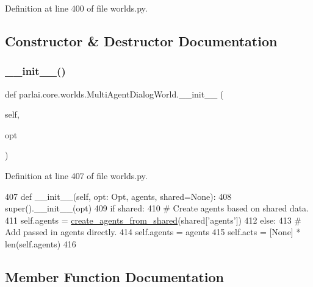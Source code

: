 Definition at line 400 of file worlds.\+py.



\subsection{Constructor \& Destructor Documentation}
\mbox{\label{classparlai_1_1core_1_1worlds_1_1MultiAgentDialogWorld_a3c952cc9deaa918119027a5accc36e65}} 
\subsubsection{\texorpdfstring{\+\_\+\+\_\+init\+\_\+\+\_\+()}{\_\_init\_\_()}}
{\footnotesize\ttfamily def parlai.\+core.\+worlds.\+Multi\+Agent\+Dialog\+World.\+\_\+\+\_\+init\+\_\+\+\_\+ (\begin{DoxyParamCaption}\item[{}]{self,  }\item[{}]{opt }\end{DoxyParamCaption})}



Definition at line 407 of file worlds.\+py.


\begin{DoxyCode}
407     \textcolor{keyword}{def }\_\_init\_\_(self, opt: Opt, agents, shared=\textcolor{keywordtype}{None}):
408         super().\_\_init\_\_(opt)
409         \textcolor{keywordflow}{if} shared:
410             \textcolor{comment}{# Create agents based on shared data.}
411             self.agents = \hyperlink{namespaceparlai_1_1core_1_1agents_a5600530545f5e60a79e2d657b5af1d8c}{create\_agents\_from\_shared}(shared[\textcolor{stringliteral}{'agents'}])
412         \textcolor{keywordflow}{else}:
413             \textcolor{comment}{# Add passed in agents directly.}
414             self.agents = agents
415         self.acts = [\textcolor{keywordtype}{None}] * len(self.agents)
416 
\end{DoxyCode}


\subsection{Member Function Documentation}
\mbox{\label{classparlai_1_1core_1_1worlds_1_1MultiAgentDialogWorld_a341fb4b45fd697d9b0978cb1ed1b26d2}} 
